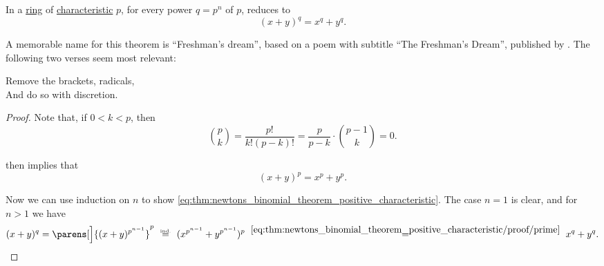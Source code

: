 \begin{corollary}\label{thm:newtons_binomial_theorem_positive_characteristic}
  In a \hyperref[def:ring]{ring} of \hyperref[def:ring_characteristic]{characteristic} \( p \), for every power \( q = p^n \) of \( p \),  reduces to
  \begin{equation}\label{eq:thm:newtons_binomial_theorem_positive_characteristic}
    (x + y)^q = x^q + y^q.
  \end{equation}
\end{corollary}
\begin{comments}
  \item A memorable name for this theorem is \enquote{Freshman's dream}, based on a poem with subtitle \enquote{The Freshman's Dream}, published by . The following two verses seem most relevant:
  \begin{displayquote}
    Remove the brackets, radicals, \\
    And do so with discretion.
  \end{displayquote}
\end{comments}
\begin{proof}
  Note that, if \( 0 < k < p \), then
  \begin{equation*}
    \binom p k = \frac {p!} {k!(p-k)!} = \frac p {p-k} \cdot \binom {p-1} k = 0.
  \end{equation*}

   then implies that
  \begin{equation}\label{eq:thm:newtons_binomial_theorem_positive_characteristic/proof/prime}
    (x + y)^p = x^p + y^p.
  \end{equation}

  Now we can use induction on \( n \) to show \eqref{eq:thm:newtons_binomial_theorem_positive_characteristic}. The case \( n = 1 \) is clear, and for \( n > 1 \) we have
  \begin{equation*}
    (x + y)^q
    =
    \parens[\Big]{ (x + y)^{p^{n-1}} }^p
    \reloset {\T{ind.}} =
    (x^{p^{n-1}} + y^{p^{n-1}})^p
    \reloset {\eqref{eq:thm:newtons_binomial_theorem_positive_characteristic/proof/prime}} =
    x^q + y^q.
  \end{equation*}
\end{proof}

